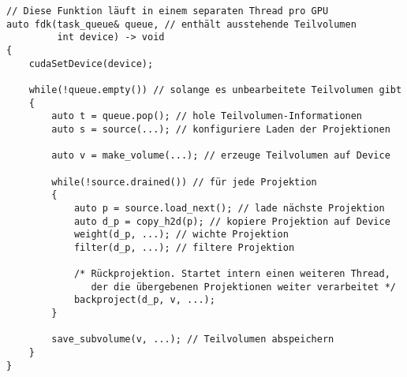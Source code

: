 \begin{code}
\begin{verbatim}
// Diese Funktion läuft in einem separaten Thread pro GPU
auto fdk(task_queue& queue, // enthält ausstehende Teilvolumen
         int device) -> void
{
    cudaSetDevice(device);

    while(!queue.empty()) // solange es unbearbeitete Teilvolumen gibt
    {
        auto t = queue.pop(); // hole Teilvolumen-Informationen
        auto s = source(...); // konfiguriere Laden der Projektionen

        auto v = make_volume(...); // erzeuge Teilvolumen auf Device

        while(!source.drained()) // für jede Projektion
        {
            auto p = source.load_next(); // lade nächste Projektion
            auto d_p = copy_h2d(p); // kopiere Projektion auf Device
            weight(d_p, ...); // wichte Projektion
            filter(d_p, ...); // filtere Projektion

            /* Rückprojektion. Startet intern einen weiteren Thread,
               der die übergebenen Projektionen weiter verarbeitet */
            backproject(d_p, v, ...);
        }

        save_subvolume(v, ...); // Teilvolumen abspeichern
    }
}     
\end{verbatim}
\label{source:high_level_fdk}
\end{code}

